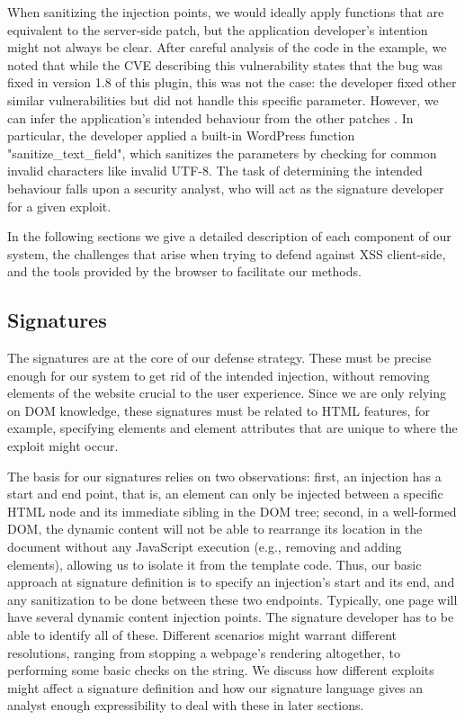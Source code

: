 When sanitizing the injection points, we would ideally apply functions that are equivalent to the server-side patch, but the application developer's intention might not always be clear. After careful analysis of the code in the example, we noted that while the CVE describing this vulnerability states that the bug was fixed in version 1.8 of this plugin, this was not the case: the developer fixed other similar vulnerabilities but did not handle this specific parameter. However, we can infer the application's intended behaviour from the other patches \cite{rccpatch}. In particular, the developer applied a built-in WordPress function "sanitize\_text\_field", which sanitizes the parameters by checking for common invalid characters like invalid UTF-8. The task of determining the intended behaviour falls upon a security analyst, who will act as the signature developer for a given exploit.  

In the following sections we give a detailed description of each component of our system, the challenges that arise when trying to defend against XSS client-side, and the tools provided by the browser to facilitate our methods. 
 
 \subsection{\sys Signatures} \label{signatures}
	 The signatures are at the core of our defense strategy. These must be precise enough for our system to get rid of the intended injection, without removing elements of the website crucial to the user experience. Since we are only relying on DOM knowledge, these signatures must be related to HTML features, for example, specifying elements and element attributes that are unique to where the exploit might occur. 
	 
	 The basis for our signatures relies on two observations: first, an injection has a start and end point, that is, an element can only be injected between a specific HTML node and its immediate sibling in the DOM tree; second, in a well-formed DOM, the dynamic content will not be able to rearrange its location in the document without any JavaScript execution (e.g., removing and adding elements), allowing us to isolate it from the template code. Thus, our basic approach at signature definition is to specify an injection's start and its end, and any sanitization to be done between these two endpoints. Typically, one page will have several dynamic content injection points. The signature developer has to be able to identify all of these. Different scenarios might warrant different resolutions, ranging from stopping a webpage's rendering altogether, to performing some basic checks on the string. We discuss how different exploits might affect a signature definition and how our signature language gives an analyst enough expressibility to deal with these in later sections.
	 
